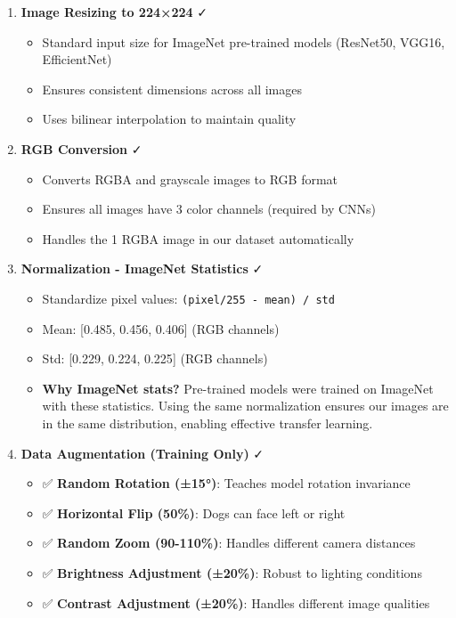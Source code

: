 \documentclass[
  letterpaper,
  DIV=11,
  numbers=noendperiod]{scrartcl}
\providecommand{\tightlist}{%
  \setlength{\itemsep}{0pt}\setlength{\parskip}{0pt}}
\begin{document}
\begin{enumerate}
\def\labelenumi{\arabic{enumi}.}
\tightlist
\item
  \textbf{Image Resizing to 224×224} ✓

  \begin{itemize}
  \tightlist
  \item
    Standard input size for ImageNet pre-trained models (ResNet50,
    VGG16, EfficientNet)
  \item
    Ensures consistent dimensions across all images
  \item
    Uses bilinear interpolation to maintain quality
  \end{itemize}
\item
  \textbf{RGB Conversion} ✓

  \begin{itemize}
  \tightlist
  \item
    Converts RGBA and grayscale images to RGB format
  \item
    Ensures all images have 3 color channels (required by CNNs)
  \item
    Handles the 1 RGBA image in our dataset automatically
  \end{itemize}
\item
  \textbf{Normalization - ImageNet Statistics} ✓

  \begin{itemize}
  \tightlist
  \item
    Standardize pixel values: \texttt{(pixel/255\ -\ mean)\ /\ std}
  \item
    Mean: {[}0.485, 0.456, 0.406{]} (RGB channels)
  \item
    Std: {[}0.229, 0.224, 0.225{]} (RGB channels)
  \item
    \textbf{Why ImageNet stats?} Pre-trained models were trained on
    ImageNet with these statistics. Using the same normalization ensures
    our images are in the same distribution, enabling effective transfer
    learning.
  \end{itemize}
\item
  \textbf{Data Augmentation (Training Only)} ✓

  \begin{itemize}
  \tightlist
  \item
    ✅ \textbf{Random Rotation (±15°)}: Teaches model rotation
    invariance
  \item
    ✅ \textbf{Horizontal Flip (50\%)}: Dogs can face left or right
  \item
    ✅ \textbf{Random Zoom (90-110\%)}: Handles different camera
    distances
  \item
    ✅ \textbf{Brightness Adjustment (±20\%)}: Robust to lighting
    conditions
  \item
    ✅ \textbf{Contrast Adjustment (±20\%)}: Handles different image
    qualities
  \end{itemize}


\end{enumerate}
\end{document}

